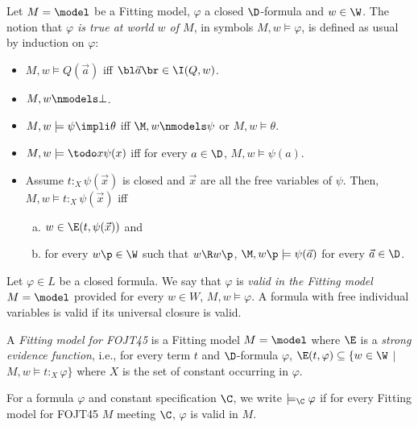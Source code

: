 \begin{defn}
Let $M = \model$ be a Fitting model, $\varphi$ a closed $\D$-formula and $w \in \W$. The notion that \textit{$\varphi$ is true at world $w$ of $M$}, in symbols $M,w \models \varphi$, is defined as usual by induction on $\varphi$: 
\begin{itemize} 
	\item $M,w \models Q(\vec{a})$ iff $\bl \vec{a}\br \in \I(Q,w)$. 
	\item $M,w \nmodels \bot$. 
	\item $M,w \models \psi \impli \theta$ iff $\M,w \nmodels \psi$ or $M,w \models \theta$.
	\item $M,w \models \todo x \psi(x)$ iff for every $a \in \D$, $M,w \models \psi(a)$.

\pagebreak	
	
	\item Assume $t$$:_{X}$$\psi(\vec{x})$ is closed and $\vec{x}$ are all the free variables of $\psi$. Then, $M,w \models t$$:_{X}$$\psi(\vec{x})$ iff
	\begin{enumerate}[(a)]
		\item $w \in \E (t, \psi(\vec{x}))$ and
		\item for every $w\p \in \W$ such that $w\R w\p$, $\M,w\p \models \psi(\vec{a})$ for every $\vec{a} \in \D$.
	\end{enumerate}

\end{itemize}

\end{defn}

	

\begin{defn}
Let $\varphi \in L$ be a closed formula. We say that $\varphi$ is \textit{valid in the Fitting model} $M = \model$ provided for every $w \in W$, $M,w \models \varphi$. A formula with free individual variables is valid if its universal closure is valid.
\end{defn}


\begin{defn}
A \textit{Fitting model for FOJT45} is a Fitting model $M = \model$ where $\E$ is a \textit{strong evidence function}, i.e., for every term $t$ and $\D$-formula $\varphi$, $\E(t,\varphi) \subseteq \{w \in \W$ $|$ $ M,w \models t$$:_{X}$$\varphi\}$ where $X$ is the set of constant occurring in $\varphi$.


\qquad For a formula $\varphi$ and constant specification $\C$, we write $\models_{\C}\varphi$ if for every Fitting model for FOJT45 $M$ meeting $\C$, $\varphi$ is valid in $M$.
\end{defn}



